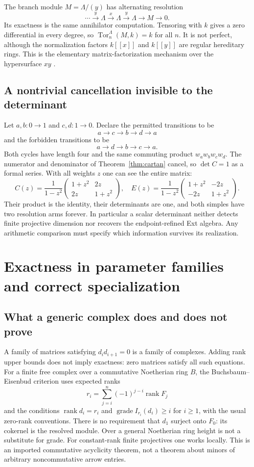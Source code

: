 The branch module $M=\Lambda/(y)$ has alternating resolution
\[
 \cdots\xrightarrow{y}\Lambda\xrightarrow{x}\Lambda
 \xrightarrow{y}\Lambda\longrightarrow M\longrightarrow0.
\]
Its exactness is the same annihilator computation. Tensoring with $k$ gives a zero differential in every degree, so $\operatorname{Tor}_n^\Lambda(M,k)=k$ for all $n$. It is not perfect, although the normalization factors $k[[x]]$ and $k[[y]]$ are regular hereditary rings. This is the elementary matrix-factorization mechanism over the hypersurface $xy$ \cite{Eisenbud}.

\subsection{A nontrivial cancellation invisible to the determinant}
Let $a,b:0\to1$ and $c,d:1\to0$. Declare the permitted transitions to be
\[
 a\to c\to b\to d\to a
\]
and the forbidden transitions to be
\[
 a\to d\to b\to c\to a.
\]
Both cycles have length four and the same commuting product $w_aw_bw_cw_d$. The numerator and denominator of Theorem~\ref{thm:cartan} cancel, so $\det C=1$ as a formal series. With all weights $z$ one can see the entire matrix:
\[
 C(z)=\frac1{1-z^2}
 \begin{pmatrix}1+z^2&2z\\2z&1+z^2\end{pmatrix},\quad
 E(z)=\frac1{1-z^2}
 \begin{pmatrix}1+z^2&-2z\\-2z&1+z^2\end{pmatrix}.
\]
Their product is the identity, their determinants are one, and both simples have two resolution arms forever. In particular a scalar determinant neither detects finite projective dimension nor recovers the endpoint-refined Ext algebra. Any arithmetic comparison must specify which information survives its realization.

\section{Exactness in parameter families and correct specialization}
\subsection{What a generic complex does and does not prove}
A family of matrices satisfying $d_id_{i+1}=0$ is a family of complexes. Adding rank upper bounds does not imply exactness: zero matrices satisfy all such equations. For a finite free complex over a commutative Noetherian ring $B$, the Buchsbaum--Eisenbud criterion \cite{BE} uses expected ranks
\[
 r_i=\sum_{j=i}^n(-1)^{j-i}\operatorname{rank}F_j
\]
and the conditions $\operatorname{rank}d_i=r_i$ and
$\operatorname{grade}I_{r_i}(d_i)\geq i$ for $i\geq1$, with the usual zero-rank conventions. There is no requirement that $d_1$ surject onto $F_0$: its cokernel is the resolved module. Over a general Noetherian ring height is not a substitute for grade. For constant-rank finite projectives one works locally. This is an imported commutative acyclicity theorem, not a theorem about minors of arbitrary noncommutative arrow entries.

